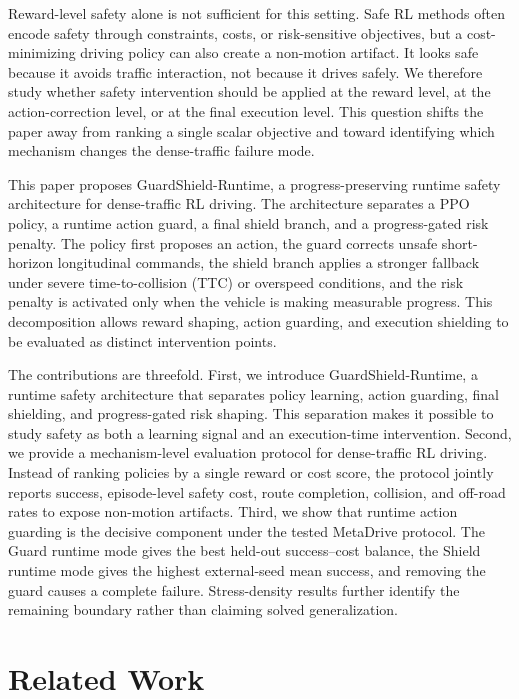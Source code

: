 \documentclass[conference,a4paper]{IEEEtran}
\newcommand{\method}{GuardShield-Runtime}
\begin{document}
Reward-level safety alone is not sufficient for this setting. Safe RL methods often encode safety through constraints, costs, or risk-sensitive objectives, but a cost-minimizing driving policy can also create a non-motion artifact. It looks safe because it avoids traffic interaction, not because it drives safely. We therefore study whether safety intervention should be applied at the reward level, at the action-correction level, or at the final execution level. This question shifts the paper away from ranking a single scalar objective and toward identifying which mechanism changes the dense-traffic failure mode.

This paper proposes \method{}, a progress-preserving runtime safety architecture for dense-traffic RL driving. The architecture separates a PPO policy, a runtime action guard, a final shield branch, and a progress-gated risk penalty. The policy first proposes an action, the guard corrects unsafe short-horizon longitudinal commands, the shield branch applies a stronger fallback under severe time-to-collision (TTC) or overspeed conditions, and the risk penalty is activated only when the vehicle is making measurable progress. This decomposition allows reward shaping, action guarding, and execution shielding to be evaluated as distinct intervention points.

The contributions are threefold. First, we introduce \method{}, a runtime safety architecture that separates policy learning, action guarding, final shielding, and progress-gated risk shaping. This separation makes it possible to study safety as both a learning signal and an execution-time intervention. Second, we provide a mechanism-level evaluation protocol for dense-traffic RL driving. Instead of ranking policies by a single reward or cost score, the protocol jointly reports success, episode-level safety cost, route completion, collision, and off-road rates to expose non-motion artifacts. Third, we show that runtime action guarding is the decisive component under the tested MetaDrive protocol. The Guard runtime mode gives the best held-out success--cost balance, the Shield runtime mode gives the highest external-seed mean success, and removing the guard causes a complete failure. Stress-density results further identify the remaining boundary rather than claiming solved generalization.

\section{Related Work}
\end{document}
